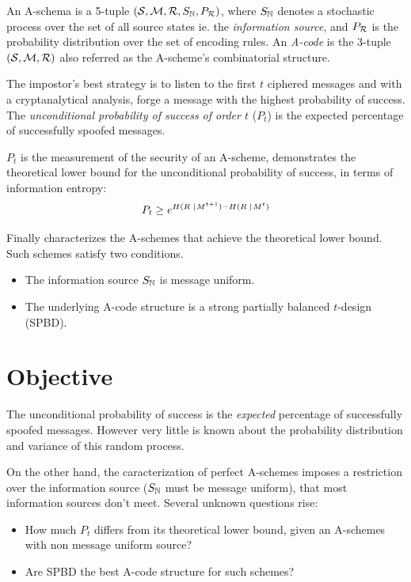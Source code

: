 \documentclass[conference]{IEEEtran}
\begin{document}
An A-schema is a 5-tuple $\left( \mathcal S,\mathcal M,\mathcal R,S_\mathbb{N}, P_\mathcal R \right)$, where $S_\mathbb{N}$ denotes a stochastic process over the set of all source states ie. the \textit{information source}, and $P_\mathcal R$ is the probability distribution over the set of encoding rules. An \textit{A-code} is the 3-tuple $\left( \mathcal S,\mathcal M,\mathcal R\right)$ also referred as the A-scheme's combinatorial structure.

The impostor's best strategy is to listen to the first $t$ ciphered messages and with a cryptanalytical analysis, forge a message with the highest probability of success. The \textit{unconditional probability of success of order $t$} ($P_t$) is the expected percentage of successfully spoofed messages.

$P_t$ is the measurement of the security of an A-scheme, \cite{b3} demonstrates the theoretical lower bound for the unconditional probability of success, in terms of information entropy:
\[
    P_t \geq
    e^{
    H(R\;\; \hspace{-0.2em} \mid \hspace{-0.15em} \;M^{t+1})
    - H(R\;\; \hspace{-0.2em} \mid \hspace{-0.15em} \;M^{t})
    }
\]

Finally \cite{b4} characterizes the A-schemes that achieve the theoretical lower bound. Such schemes satisfy two conditions.
\begin{itemize}
    \item The information source $S_\mathbb{N}$ is message uniform.
    \item The underlying A-code structure is a strong partially balanced $t$-design (SPBD).
\end{itemize}

%
%
\section{Objective}
The unconditional probability of success is the \textit{expected} percentage of successfully spoofed messages. However very little is known about the probability distribution and variance of this random process.

On the other hand, the caracterization of perfect A-schemes imposes a restriction over the information source ($S_\mathbb{N}$ must be message uniform), that most information sources don't meet. Several unknown questions rise:
\begin{itemize}
    \item How much $P_t$ differs from its theoretical lower bound, given an A-schemes with non message uniform source?
    \item Are SPBD the best A-code structure for such schemes?
\end{itemize}
\end{document}
